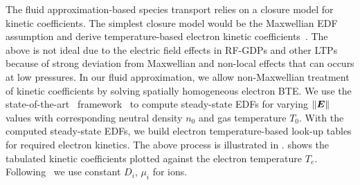 The fluid approximation-based species transport relies on a closure model for kinetic coefficients. The simplest closure model would be the Maxwellian EDF assumption and derive temperature-based electron kinetic coefficients~\cite{liu2014numerical}. The above is not ideal due to the electric field effects in RF-GDPs and other LTPs because of strong deviation from Maxwellian and non-local effects that can occurs at low pressures. In our fluid approximation, we allow non-Maxwellian treatment of kinetic coefficients by solving spatially homogeneous electron BTE. We use the state-of-the-art \bolsig~framework~\cite{hagelaar2005solving} to compute steady-state EDFs for varying $\left\lVert\boldsymbol{E}\right\rVert$ values with corresponding neutral density $n_0$ and gas temperature $T_0$. With the computed steady-state EDFs, we build electron temperature-based look-up tables for required electron kinetics. The above process is illustrated in .  shows the tabulated kinetic coefficients plotted against the electron temperature $T_e$. Following~\cite{liu2014numerical} we use constant $D_i$, $\mu_i$ for ions. 

